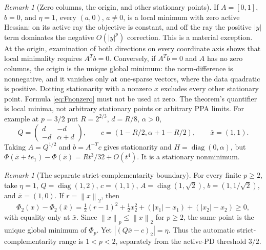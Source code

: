 \documentclass[11pt]{article}
\newcommand{\norm}[1]{\left\lVert#1\right\rVert}
\theoremstyle{remark}\newtheorem{remark}[theorem]{Remark}
\begin{document}
\begin{remark}[Zero columns, the origin, and other stationary points]
If $A=[0,1]$, $b=0$, and $\eta=1$, every $(a,0)$, $a\ne0$, is a
local minimum with zero active Hessian: on its active ray the objective
is constant, and off the ray the positive $|y|$ term dominates the
negative $O(|y|^p)$ correction. This is a material exception.
At the origin, examination of both directions on every coordinate axis
shows that local minimality requires $A^Tb=0$. Conversely, if $A^Tb=0$
and $A$ has no zero columns, the origin is the unique global minimum:
the norm-difference is nonnegative, and it vanishes only at one-sparse
vectors, where the data quadratic is positive. Dotting stationarity
with a nonzero $x$ excludes every other stationary point. Formula
\eqref{eq:Fnonzero} must not be used at zero. The theorem's quantifier is
local minima, not arbitrary stationary points or arbitrary PPA limits.
For example at $p=3/2$ put $R=2^{2/3}$, $d=R/8$, $\alpha>0$,
\[
 Q=\begin{pmatrix}d&-d\\-d&\alpha+d\end{pmatrix},\qquad
 c=(1-R/2,\alpha+1-R/2),\qquad \bar x=(1,1).
\]
Taking $A=Q^{1/2}$ and $b=A^{-T}c$ gives stationarity and
$H=\operatorname{diag}(0,\alpha)$, but
$\Phi(\bar x+te_1)-\Phi(\bar x)=Rt^3/32+O(t^4)$.
It is a stationary nonminimum.
\end{remark}

\begin{remark}[The separate strict-complementarity boundary]
For every finite $p\ge2$, take $\eta=1$, $Q=\operatorname{diag}(1,2)$,
$c=(1,1)$, $A=\operatorname{diag}(1,\sqrt2)$,
$b=(1,1/\sqrt2)$, and $\bar x=(1,0)$. If $r=\norm x_2$, then
\[
 \Phi_2(x)-\Phi_2(\bar x)=\tfrac12(r-1)^2+\tfrac12x_2^2
 +(|x_1|-x_1)+(|x_2|-x_2)\ge0,
\]
with equality only at $\bar x$. Since $\norm x_p\le\norm x_2$ for
$p\ge2$, the same point is the unique global minimum of $\Phi_p$.
Yet $|(Q\bar x-c)_2|=\eta$. Thus the automatic strict-complementarity
range is $1<p<2$, separately from the active-PD threshold $3/2$.
\end{remark}
\end{document}
